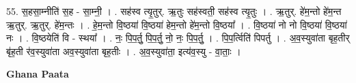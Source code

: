 \documentclass[17pt]{extarticle}
\begin{document}
55. स॒हसा॒म्नीति॑ स॒ह - सा॒म्नी॒ । . सह॑स्व त्यृ॒तुर्. ऋ॒तुः सह॑स्वती॒ सह॑स्व त्यृ॒तुः । . ऋ॒तुर्. हे॑म॒न्तो हे॑म॒न्त ऋ॒तुर्. ऋ॒तुर्. हे॑म॒न्तः । . हे॒म॒न्तो वि॒ष्ठया॑ वि॒ष्ठया॑ हेम॒न्तो हे॑म॒न्तो वि॒ष्ठया᳚ । . वि॒ष्ठया॑ नो नो वि॒ष्ठया॑ वि॒ष्ठया॑ नः । . वि॒ष्ठयेति॑ वि - स्थया᳚ । . नः॒ पि॒प॒र्तु॒ पि॒प॒र्तु॒ नो॒ नः॒ पि॒प॒र्तु॒ । . पि॒प॒र्त्विति॑ पिपर्तु । . अ॒व॒स्युवा॑ता बृह॒तीर् बृ॑ह॒ती र॑व॒स्युवा॑ता अव॒स्युवा॑ता बृह॒तीः । . अ॒व॒स्युवा॑ता॒ इत्य॑व॒स्यु - वा॒ताः॒ । \newline

\textbf{Ghana Paata } \newline
\end{document}
